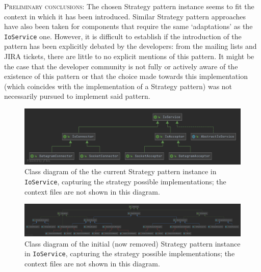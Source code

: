 \textsc{Preliminary conclusions}: The chosen Strategy pattern instance seems to fit the context in which it has been introduced. Similar Strategy pattern approaches have also been taken for components that require the same `adaptations' as the \texttt{IoService} one. However, it is difficult to establish if the introduction of the pattern has been explicitly debated by the developers: from the mailing lists and JIRA tickets, there are little to no explicit mentions of this pattern. It might be the case that the developer community is not fully or actively aware of the existence of this pattern or that the choice made towards this implementation (which coincides with the implementation of a Strategy pattern) was not necessarily pursued to implement said pattern.  
\begin{landscape}
    \begin{figure}
    \centering
    \includegraphics[width = \textwidth ]{images/class_diagrams/strategy_current.png}
    \caption{Class diagram of the the current Strategy pattern instance in \texttt{IoService}, capturing the strategy possible implementations; the context files are not shown in this diagram.}
    \label{fig:strategy_current}
\end{figure}
    \begin{figure}
        \centering
        \includegraphics[scale = 0.2 ]{images/class_diagrams/strategy_removed.png}
        \caption{Class diagram of the initial (now removed) Strategy pattern instance in \texttt{IoService}, capturing the strategy possible implementations; the context files are not shown in this diagram.}
        \label{fig:strategy_removed}
    \end{figure}
\end{landscape}

